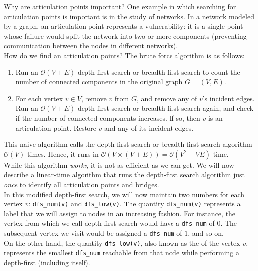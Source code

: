 Why are articulation points important? One example in which searching for articulation points is important is in the study of networks. In a network modeled by a graph, an articulation point represents a vulnerability: it is a single point whose failure would split the network into two or more components (preventing communication between the nodes in different networks). 
 \\
 
 
 How do we find an articulation points? The brute force algorithm is as follows:
 
 \begin{enumerate}
     \item Run an $\mathcal{O}(V + E)$ depth-first search or breadth-first search to count the number of connected components in the original graph $G = (V, E)$. 
     \item For each vertex $v\in V$, remove $v$ from $G$, and remove any of $v$'s incident edges. Run an $\mathcal{O}(V + E)$ depth-first search or breadth-first search again, and check if the number of connected components increases. If so, then $v$ is an articulation point. Restore $v$ and any of its incident edges.
 \end{enumerate}
 
This naive algorithm calls the depth-first search or breadth-first search algorithm $\mathcal{O}(V)$ times. Hence, it runs in $\mathcal{O}(V \times (V + E)) = \mathcal{O}(V^2 + VE)$ time. \\
 
 
While this algorithm \textit{works}, it is not as efficient as we can get. We will now describe a linear-time algorithm that runs the depth-first search algorithm just \textit{once} to identify all articulation points and bridges. \\
 
 
In this modified depth-first search, we will now maintain two numbers for each vertex $v$: \verb!dfs_num(v)! and \verb!dfs_low(v)!. The quantity \verb!dfs_num(v)! represents a label that we will assign to nodes in an increasing fashion. For instance, the vertex from which we call depth-first search would have a \verb!dfs_num! of $0$. The subsequent vertex we visit would be assigned a \verb!dfs_num! of $1$, and so on. \\
 
On the other hand, the quantity \verb!dfs_low(v)!, also known as the  of the vertex $v$, represents the smallest \verb!dfs_num! reachable from that node while performing a depth-first (including itself). \\
 
